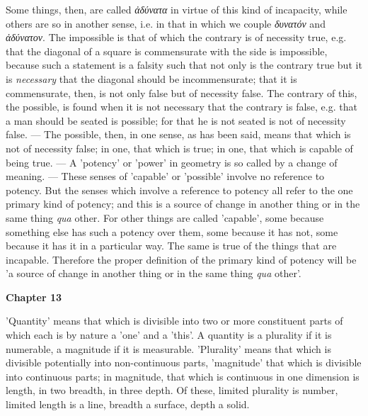 Some things, then, are called \emph{ἀδύνατα} in virtue of this kind of incapacity, while others are so in another sense, i.e. in that in which we couple \emph{δυνατόν} and \emph{ἀδύνατον}. The impossible is that of which the contrary is of necessity true, e.g. that the diagonal of a square is commensurate with the side is impossible, because such a statement is a falsity such that not only is the contrary true but it is \emph{necessary} that the diagonal should be incommensurate; that it is commensurate, then, is not only false but of necessity false. The contrary of this, the possible, is found when it is not necessary that the contrary is false, e.g. that a man should be seated is possible; for that he is not seated is not of necessity false. — The possible, then, in one sense, as has been said, means that which is not of necessity false; in one, that which is true; in one, that which is capable of being true. — A 'potency' or 'power' in geometry is so called by a change of meaning. — These senses of 'capable' or 'possible' involve no reference to potency. But the senses which involve a reference to potency all refer to the one primary kind of potency; and this is a source of change in another thing or in the same thing \emph{qua} other. For other things are called 'capable', some because something else has such a potency over them, some because it has not, some because it has it in a particular way. The same is true of the things that are incapable. Therefore the proper definition of the primary kind of potency will be 'a source of change in another thing or in the same thing \emph{qua} other'.

\textbf{Chapter 13}

'Quantity' means that which is divisible into two or more constituent parts of which each is by nature a 'one' and a 'this'. A quantity is a plurality if it is numerable, a magnitude if it is measurable. 'Plurality' means that which is divisible potentially into non-continuous parts, 'magnitude' that which is divisible into continuous parts; in magnitude, that which is continuous in one dimension is length, in two breadth, in three depth. Of these, limited plurality is number, limited length is a line, breadth a surface, depth a solid.


